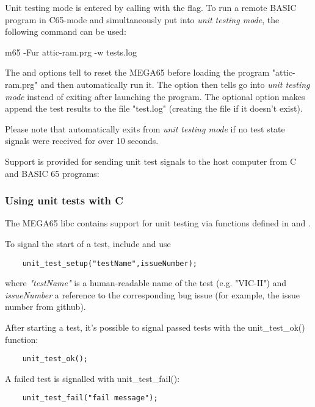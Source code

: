 Unit testing mode is entered by calling  with the  flag. 
To run a remote BASIC program in C65-mode and simultaneously put 
into \textit{unit testing mode}, the following command can be used:

\begin{screencode}
    m65 -Fur attic-ram.prg -w tests.log
\end{screencode}

The  and  options tell  to reset the MEGA65
before loading the program "attic-ram.prg" and then automatically run it. 
The  option then tells  go into \textit{unit testing mode} 
instead of exiting after launching the program.
The optional  option makes  append the test results to the 
file "test.log" (creating the file if it doesn't exist). 

Please note that  automatically exits from \textit{unit testing mode}
if no test state signals were received for over 10 seconds.

Support is provided for sending unit test signals to the host computer from
C and BASIC 65 programs:

\subsubsection{Using unit tests with C}

The MEGA65 libc contains support for unit testing via functions defined in 
 and . 

To signal the start of a test, include  and use

\begin{verbatim}
    unit_test_setup("testName",issueNumber);
\end{verbatim}

where \textit{"testName"} is a human-readable name of the test (e.g. 
"VIC-II") and \textit{issueNumber} a reference to the corresponding
bug issue (for example, the issue number from github).

After starting a test, it's possible to signal passed tests with 
the unit\_test\_ok() function:

\begin{verbatim}
    unit_test_ok();
\end{verbatim}

A failed test is signalled with unit\_test\_fail():

\begin{verbatim}
    unit_test_fail("fail message");
\end{verbatim}

